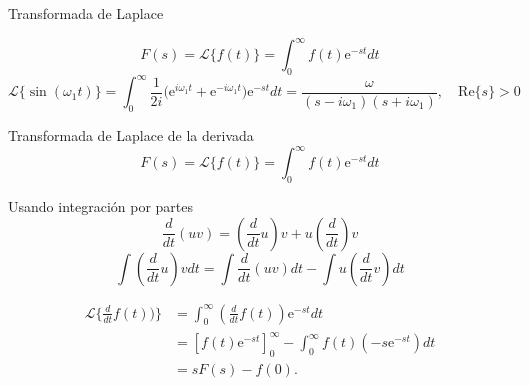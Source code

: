\documentclass[dvisvgm,hypertex,aspectratio=169]{beamer}
\renewcommand*{\laplace}[1]{\ensuremath{\mathcal{L}\big\{ #1 \big\}}}
\renewcommand*{\mexp}[1]{\ensuremath{\mathrm{e}^{#1}}}
\begin{document}
  \begin{frame}[label=LA2A]{Transformada de Laplace}

    \[F(s) = \laplace{f(t)} = \int_0^\infty f(t)\mexp{-st}dt\]
    \[\laplace{\sin(\omega_1 t)} = \int_0^\infty \frac{1}{2i} \big( \mexp{i\omega_1t} + \mexp{-i\omega_1 t}\big)\mexp{-st}dt = \frac{\omega}{(s-i\omega_1)(s+i\omega_1)}, \quad \mathrm{Re}\{s\}>0 \]

\begin{center}
      \begin{animateinline}[controls,]{2}
      \end{animateinline}
    \end{center}
  \end{frame}

    \begin{frame}[label=LA3]{Transformada de Laplace de la derivada}
    \[F(s) = \laplace{f(t)} = \int_0^\infty f(t)\mexp{-st}dt\]

    {\scriptsize
    Usando integración por partes
    \[ \frac{d}{dt}(uv) = (\frac{d}{dt} u) v + u (\frac{d}{dt}) v \]
    \[ \int (\frac{d}{dt} u) v dt  = \int \frac{d}{dt}(uv) dt - \int u (\frac{d}{dt} v ) dt \]
  }
  
    \begin{align*}
      \laplace{\frac{d}{dt}f(t))} &= \int_0^\infty (\frac{d}{dt}f(t))\mexp{-st}dt\\
                                  &= \left[f(t)\mexp{-st}\right]_0^\infty - \int_0^\infty f(t)(-s\mexp{-st})dt\\
                                  &= sF(s) - f(0).
    \end{align*}
  \end{frame}
\end{document}
